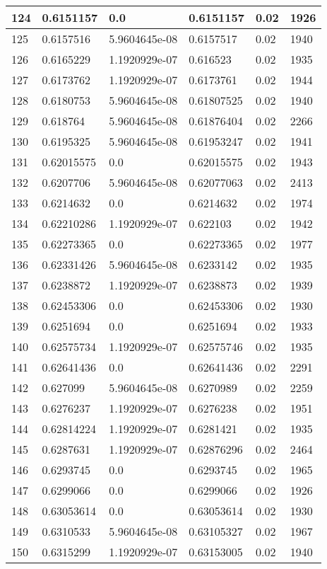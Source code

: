 \begin{longtable}{|l|l|l|l|l|l|}
124 & 0.6151157 & 0.0 & 0.6151157 & 0.02 & 1926 \\ \hline 
125 & 0.6157516 & 5.9604645e-08 & 0.6157517 & 0.02 & 1940 \\ \hline 
126 & 0.6165229 & 1.1920929e-07 & 0.616523 & 0.02 & 1935 \\ \hline 
127 & 0.6173762 & 1.1920929e-07 & 0.6173761 & 0.02 & 1944 \\ \hline 
128 & 0.6180753 & 5.9604645e-08 & 0.61807525 & 0.02 & 1940 \\ \hline 
129 & 0.618764 & 5.9604645e-08 & 0.61876404 & 0.02 & 2266 \\ \hline 
130 & 0.6195325 & 5.9604645e-08 & 0.61953247 & 0.02 & 1941 \\ \hline 
131 & 0.62015575 & 0.0 & 0.62015575 & 0.02 & 1943 \\ \hline 
132 & 0.6207706 & 5.9604645e-08 & 0.62077063 & 0.02 & 2413 \\ \hline 
133 & 0.6214632 & 0.0 & 0.6214632 & 0.02 & 1974 \\ \hline 
134 & 0.62210286 & 1.1920929e-07 & 0.622103 & 0.02 & 1942 \\ \hline 
135 & 0.62273365 & 0.0 & 0.62273365 & 0.02 & 1977 \\ \hline 
136 & 0.62331426 & 5.9604645e-08 & 0.6233142 & 0.02 & 1935 \\ \hline 
137 & 0.6238872 & 1.1920929e-07 & 0.6238873 & 0.02 & 1939 \\ \hline 
138 & 0.62453306 & 0.0 & 0.62453306 & 0.02 & 1930 \\ \hline 
139 & 0.6251694 & 0.0 & 0.6251694 & 0.02 & 1933 \\ \hline 
140 & 0.62575734 & 1.1920929e-07 & 0.62575746 & 0.02 & 1935 \\ \hline 
141 & 0.62641436 & 0.0 & 0.62641436 & 0.02 & 2291 \\ \hline 
142 & 0.627099 & 5.9604645e-08 & 0.6270989 & 0.02 & 2259 \\ \hline 
143 & 0.6276237 & 1.1920929e-07 & 0.6276238 & 0.02 & 1951 \\ \hline 
144 & 0.62814224 & 1.1920929e-07 & 0.6281421 & 0.02 & 1935 \\ \hline 
145 & 0.6287631 & 1.1920929e-07 & 0.62876296 & 0.02 & 2464 \\ \hline 
146 & 0.6293745 & 0.0 & 0.6293745 & 0.02 & 1965 \\ \hline 
147 & 0.6299066 & 0.0 & 0.6299066 & 0.02 & 1926 \\ \hline 
148 & 0.63053614 & 0.0 & 0.63053614 & 0.02 & 1930 \\ \hline 
149 & 0.6310533 & 5.9604645e-08 & 0.63105327 & 0.02 & 1967 \\ \hline 
150 & 0.6315299 & 1.1920929e-07 & 0.63153005 & 0.02 & 1940 \\ \hline 
\end{longtable}